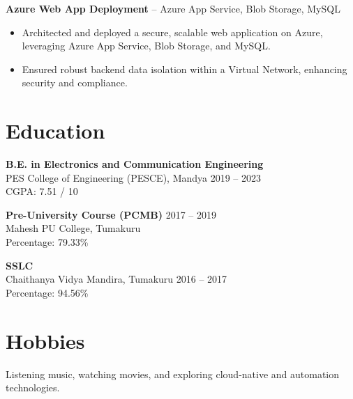\documentclass[a4paper,10pt]{article}
\begin{document}
\textbf{Azure Web App Deployment} – Azure App Service, Blob Storage, MySQL
\begin{itemize}[leftmargin=0.25in, label=\textbullet]
    \item Architected and deployed a secure, scalable web application on Azure, leveraging Azure App Service, Blob Storage, and MySQL.
    \item Ensured robust backend data isolation within a Virtual Network, enhancing security and compliance.
\end{itemize}

\section*{Education}
\textbf{B.E. in Electronics and Communication Engineering} \\
PES College of Engineering (PESCE), Mandya \hfill 2019 – 2023 \\
CGPA: 7.51 / 10

\textbf{Pre-University Course (PCMB)} \hfill 2017 – 2019 \\
Mahesh PU College, Tumakuru \\
Percentage: 79.33\%

\textbf{SSLC} \\
Chaithanya Vidya Mandira, Tumakuru \hfill 2016 – 2017 \\
Percentage: 94.56\%

\section*{Hobbies}
Listening music, watching movies, and exploring cloud-native and automation technologies.
\end{document}
